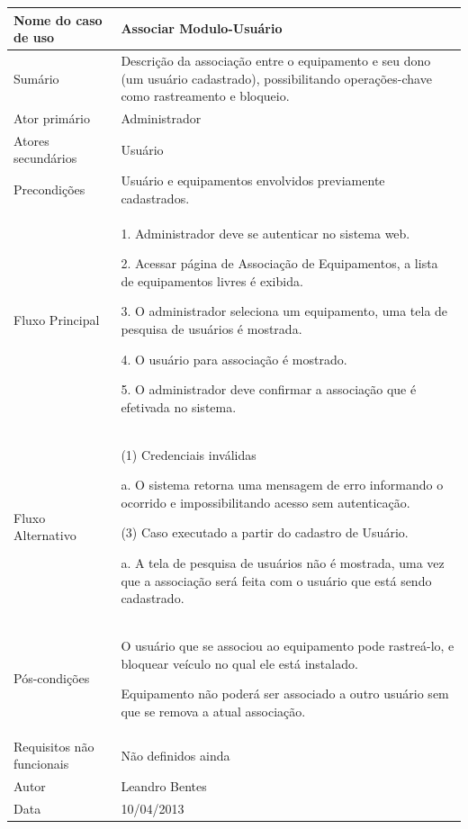 \begin{flushleft}
\tablefirsthead{}
\tablehead{}
\tabletail{}
\tablelasttail{}
\begin{supertabular}{|m{5.5680003cm}|m{9.325cm}|}
\hline
Nome do caso de uso &
Associar Modulo-Usuário\\\hline
Sumário &
Descrição da associação entre o equipamento e seu dono (um usuário cadastrado), possibilitando operações-chave como rastreamento e bloqueio. \\\hline
Ator primário &
Administrador\\\hline
Atores secundários &
Usuário\\\hline
Precondições &
Usuário e equipamentos envolvidos previamente cadastrados.\\\hline
Fluxo Principal &
1. Administrador deve se autenticar no sistema web.

2. Acessar página de Associação de Equipamentos, a lista de equipamentos livres é exibida.

3. O administrador seleciona um equipamento, uma tela de pesquisa de usuários é mostrada.

4. O usuário para associação é mostrado.

5. O administrador deve confirmar a associação que é efetivada no sistema.\\\hline
Fluxo Alternativo &
(1) Credenciais inválidas

a. O sistema retorna uma mensagem de erro informando o ocorrido e impossibilitando acesso sem autenticação.

(3) Caso executado a partir do cadastro de Usuário.

a. A tela de pesquisa de usuários não é mostrada, uma vez que a associação será feita com o usuário que está sendo cadastrado. \\\hline
Pós-condições &
O usuário que se associou ao equipamento pode rastreá-lo, e bloquear veículo no qual ele está instalado.

Equipamento não poderá ser associado a outro usuário sem que se remova a atual associação.\\\hline
Requisitos não funcionais &
Não definidos ainda\\\hline
Autor &
Leandro Bentes\\\hline
Data &
10/04/2013\\\hline
\end{supertabular}
\end{flushleft}

